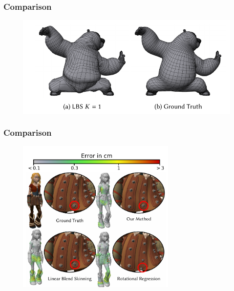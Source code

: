 \documentclass[serif,mathserif, 12pt]{beamer}
\begin{document}
\begin{frame}
  \frametitle{Comparison}
  \begin{figure}
    \centering
    \includegraphics[width=\textwidth]{img/mesh_comp}
  \end{figure}
\end{frame}

\begin{frame}
  \frametitle{Comparison}
  \begin{figure}
    \centering
    \includegraphics[width=0.7\textwidth]{img/details}
  \end{figure}
\end{frame}
\end{document}
